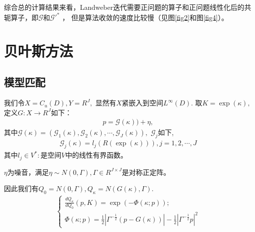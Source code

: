 \documentclass[a4paper,12pt,oneside,CJK]{cctbook}
\theoremstyle{definition}
\numberwithin{equation}{section}
\begin{document}
综合总的计算结果来看，Landweber迭代需要正问题的算子和正问题线性化后的共轭算子，即$\mathcal{G}$和$\mathcal{G}'^*$ ， 但是算法收敛的速度比较慢（见图\ref{fig2}和图\ref{fig4}）。


\chapter{贝叶斯方法}


\section{模型匹配}

我们令$X=C_u(D),Y=R^J,$ 显然有$X$紧嵌入到空间$L^{\infty}(D).$
取$K=\exp(\kappa),$定义$G:X\rightarrow R^J$如下：
\begin{eqnarray}
    p=\mathcal{G}(\kappa))+\eta,
\end{eqnarray}
其中$
\mathcal{G}(\kappa)=(\mathcal{G}_1(\kappa),\mathcal{G}_2(\kappa),\cdots,\mathcal{G}_J(\kappa)),$
$\mathcal{G}_j$如下,
\begin{eqnarray}
   \mathcal{G}_j(\kappa)=l_j(R(\exp(\kappa))),j=1,2,\cdots,J
\end{eqnarray}
其中$l_j\in V^*:$是空间$V$中的线性有界函数。

$\eta$为噪音，满足$\eta\sim N(0,\Gamma),\Gamma\in R^{J\times J}$是对称正定阵。

因此我们有$Q_0=N(0,\Gamma),Q_{\kappa}=N(G(\kappa),\Gamma)$.
\begin{eqnarray}
   \left\{
   \begin{array}{ll}
   \frac{d Q_{\kappa}}{d Q_0}(p,K)=\exp(-\Phi(\kappa;p));\\
   \Phi(\kappa;p)=\frac{1}{2}|\Gamma^{-\frac{1}{2}}(p-G(\kappa))|-\frac{1}{2}|\Gamma^{-\frac{1}{2}}p|^2
   \end{array}
   \right.
\end{eqnarray}
\end{document}
